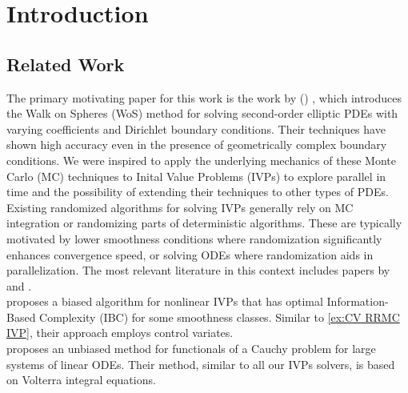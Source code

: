 \documentclass[a4paper,12pt]{article}
\begin{document}


\newpage
\tableofcontents
\newpage

\begin{abstract}
  
\end{abstract}


\section{Introduction}

\subsection{Related Work}
The primary motivating paper for this work is the work
by \citeauthor{sawhney_grid-free_2022}
(\citeyear{sawhney_grid-free_2022}) \cite{sawhney_grid-free_2022},
which introduces the Walk on Spheres (WoS) method for solving second-order
elliptic PDEs with varying coefficients and Dirichlet boundary conditions.
Their techniques have shown high accuracy even in the presence of geometrically
complex boundary conditions. We were inspired to apply the underlying
mechanics of these Monte Carlo (MC) techniques to Inital Value Problems (IVPs) to explore
parallel in time and the possibility of extending their techniques
to other types of PDEs. \\


Existing randomized algorithms for solving IVPs generally rely on MC integration or randomizing parts
of deterministic algorithms. These are typically motivated by lower smoothness conditions where randomization
significantly enhances convergence speed, or solving ODEs where randomization aids in parallelization.
The most relevant literature in this context includes papers by
\citeauthor{daun_randomized_2011} and \citeauthor{ermakov_monte_2021}. \\


\citeauthor{daun_randomized_2011} \citeyear{daun_randomized_2011} \cite{daun_randomized_2011}
proposes a biased algorithm for nonlinear IVPs that has optimal Information-Based Complexity (IBC) for
some smoothness classes. Similar to \ref{ex:CV RRMC IVP}, their approach employs control variates. \\

\citeauthor{ermakov_monte_2021} \citeyear{ermakov_monte_2021} \cite{ermakov_monte_2021} proposes
an unbiased method for functionals of a Cauchy problem for large systems of linear ODEs. Their method, similar
to all our IVPs solvers, is based on Volterra integral equations.
\newpage
\end{document}
